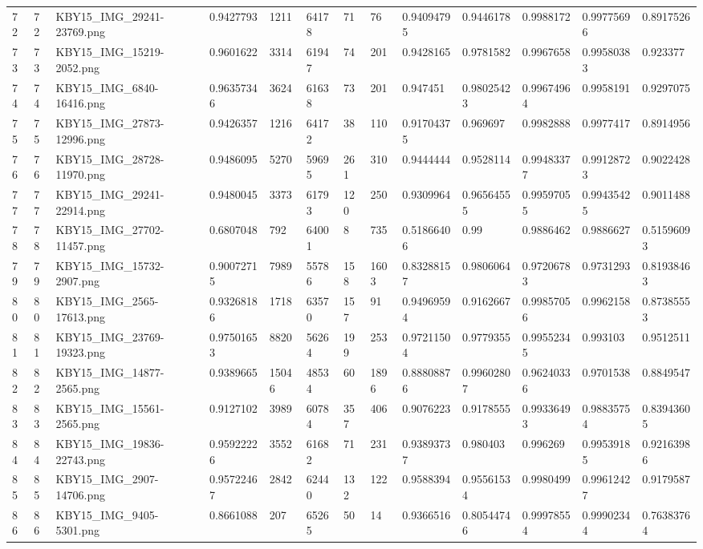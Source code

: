 \documentclass[11pt, a4paper, twoside]{report}
\begin{document}
\begin{longtable}[c]{@{}lllllllllllll@{}}
72 & 72 & KBY15\_IMG\_29241-23769.png & 0.9427793 & 1211 & 64178 & 71 & 76 & 0.94094795 & 0.9446178 & 0.9988172 & 0.99775696 & 0.8917526 \\
73 & 73 & KBY15\_IMG\_15219-2052.png & 0.9601622 & 3314 & 61947 & 74 & 201 & 0.9428165 & 0.9781582 & 0.9967658 & 0.99580383 & 0.923377 \\
74 & 74 & KBY15\_IMG\_6840-16416.png & 0.96357346 & 3624 & 61638 & 73 & 201 & 0.947451 & 0.98025423 & 0.99674964 & 0.9958191 & 0.9297075 \\
75 & 75 & KBY15\_IMG\_27873-12996.png & 0.9426357 & 1216 & 64172 & 38 & 110 & 0.91704375 & 0.969697 & 0.9982888 & 0.9977417 & 0.8914956 \\
76 & 76 & KBY15\_IMG\_28728-11970.png & 0.9486095 & 5270 & 59695 & 261 & 310 & 0.9444444 & 0.9528114 & 0.99483377 & 0.99128723 & 0.9022428 \\
77 & 77 & KBY15\_IMG\_29241-22914.png & 0.9480045 & 3373 & 61793 & 120 & 250 & 0.9309964 & 0.96564555 & 0.99597055 & 0.99435425 & 0.9011488 \\
78 & 78 & KBY15\_IMG\_27702-11457.png & 0.6807048 & 792 & 64001 & 8 & 735 & 0.51866406 & 0.99 & 0.9886462 & 0.9886627 & 0.51596093 \\
79 & 79 & KBY15\_IMG\_15732-2907.png & 0.90072715 & 7989 & 55786 & 158 & 1603 & 0.83288157 & 0.9806064 & 0.97206783 & 0.9731293 & 0.81938463 \\
80 & 80 & KBY15\_IMG\_2565-17613.png & 0.93268186 & 1718 & 63570 & 157 & 91 & 0.94969594 & 0.9162667 & 0.99857056 & 0.9962158 & 0.87385553 \\
81 & 81 & KBY15\_IMG\_23769-19323.png & 0.97501653 & 8820 & 56264 & 199 & 253 & 0.97211504 & 0.9779355 & 0.99552345 & 0.993103 & 0.9512511 \\
82 & 82 & KBY15\_IMG\_14877-2565.png & 0.9389665 & 15046 & 48534 & 60 & 1896 & 0.88808876 & 0.99602807 & 0.96240336 & 0.9701538 & 0.8849547 \\
83 & 83 & KBY15\_IMG\_15561-2565.png & 0.9127102 & 3989 & 60784 & 357 & 406 & 0.9076223 & 0.9178555 & 0.99336493 & 0.98835754 & 0.83943605 \\
84 & 84 & KBY15\_IMG\_19836-22743.png & 0.95922226 & 3552 & 61682 & 71 & 231 & 0.93893737 & 0.980403 & 0.996269 & 0.99539185 & 0.92163986 \\
85 & 85 & KBY15\_IMG\_2907-14706.png & 0.95722467 & 2842 & 62440 & 132 & 122 & 0.9588394 & 0.95561534 & 0.9980499 & 0.99612427 & 0.9179587 \\
86 & 86 & KBY15\_IMG\_9405-5301.png & 0.8661088 & 207 & 65265 & 50 & 14 & 0.9366516 & 0.80544746 & 0.99978554 & 0.99902344 & 0.76383764 \\

\end{longtable}
\end{document}
